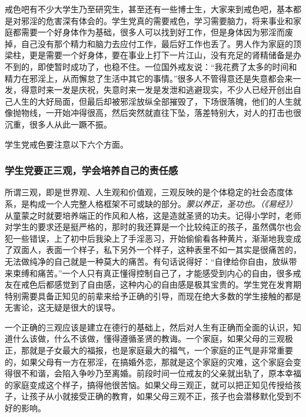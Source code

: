 戒色吧有不少大学生乃至研究生，甚至还有一些博士生，大家来到戒色吧，基本都是对邪淫的危害深有体会的。学生党真的需要戒色，学习需要脑力，将来事业和家庭都需要一个好身体作为基础，很多人可以找到好工作，但是身体因为邪淫而废掉，自己没有那个精力和脑力去应付工作，最后好工作也丢了。男人作为家庭的顶梁柱，更是需要一个好身体，要在事业上打下一片江山，没有充足的肾精储备是办不到的，即使暂时成功了，也稳不住。一位国外戒友说：“我花费了太多的时间和精力在邪淫上，从而懈怠了生活中其它的事情。”很多人不管得意还是失意都会来一发，得意时来一发是庆祝，失意时来一发是发泄和逃避现实，不少人已经开创出自己人生的大好局面，但最后却被邪淫放纵全部摧毁了，下场很落魄，他们的人生就像抛物线，一开始冲得很高，然后突然就直往下坠，落差特别大，对人的打击也很沉重，很多人从此一蹶不振。

学生党戒色要注意以下六个方面。

\subsubsection{学生党要正三观，学会培养自己的责任感}

所谓三观，即是世界观、人生观和价值观，三观反映的是个体稳定的社会态度体系，是构成一个人完整人格框架不可或缺的部分。\textit{蒙以养正，圣功也。（《易经》）} 从童蒙之时就要培养端正的作风和人格，这是造就圣贤的功夫。记得小学时，老师对学生的要求还是挺严格的，那时的我还算是一个比较纯正的孩子，虽然偶尔也会犯一些错误，上了初中后我染上了手淫恶习，开始偷偷看各种黄片，渐渐地我变成了双面人，表面一个样子，私下另外一个样子，这种表里不如一其实是很痛苦的，无法做纯净的自己就是一种莫大的痛苦。有句话说得好：“自律给你自由，放纵带来束缚和痛苦。”一个人只有真正懂得控制自己了，才能感受到内心的自由，很多戒友在戒色后都感觉到了自由感，这种内心的自由感是极其宝贵的。学生党在发育期特别需要具备正知见的前辈来给予正确的引导，而现在绝大多数的学生接触的都是无害论，这无疑是很大的误导。

一个正确的三观应该是建立在德行的基础上，然后对人生有正确而全面的认识，知道什么该做，什么不该做，懂得遵循圣贤的教诲。一个家庭，如果父母的三观极正，那就是子女最大的福报，也是家庭最大的福气，一个家庭的正气是非常重要的，如果父母有一方在邪淫，在搞婚外恋，那就是这个家庭的灾难，这个家庭会变得很不和谐，会陷入争吵乃至离婚。前段时间一位戒友的父亲就出轨了，原本幸福的家庭变成这个样子，搞得他很苦恼。如果父母三观正，就可以把正知见传授给孩子，让孩子从小就接受正确的教育，如果父母三观不正，孩子也会潜移默化受到不好的影响。

